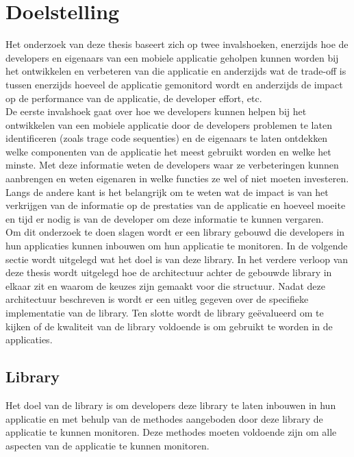 \chapter{Doelstelling}
Het onderzoek van deze thesis baseert zich op twee invalshoeken, enerzijds hoe de developers en eigenaars van een mobiele applicatie geholpen kunnen worden bij het ontwikkelen en verbeteren van die applicatie en anderzijds wat de trade-off is tussen enerzijds hoeveel de applicatie gemonitord wordt en anderzijds de impact op de performance van de applicatie, de developer effort, etc. \\

De eerste invalshoek gaat over hoe we developers kunnen helpen bij het ontwikkelen van een mobiele applicatie door de developers problemen te laten identificeren (zoals trage code sequenties) en de eigenaars te laten ontdekken welke componenten van de applicatie het meest gebruikt worden en welke het minste. Met deze informatie weten de developers waar ze verbeteringen kunnen aanbrengen en weten eigenaren in welke functies ze wel of niet moeten investeren. Langs de andere kant is het belangrijk om te weten wat de impact is van het verkrijgen van de informatie op de prestaties van de applicatie en hoeveel moeite en tijd er nodig is van de developer om deze informatie te kunnen vergaren.\\


Om dit onderzoek te doen slagen wordt er een library gebouwd die developers in hun applicaties kunnen inbouwen om hun applicatie te monitoren. In de volgende sectie wordt uitgelegd wat het doel is van deze library. In het verdere verloop van deze thesis wordt uitgelegd hoe de architectuur achter de gebouwde library in elkaar zit en waarom de keuzes zijn gemaakt voor die structuur. Nadat deze architectuur beschreven is wordt er een uitleg gegeven over de specifieke implementatie van de library. Ten slotte wordt de library ge\"evalueerd om te kijken of de kwaliteit van de library voldoende is om gebruikt te worden in de applicaties. 

\section{Library}
Het doel van de library is om developers deze library te laten inbouwen in hun applicatie en met behulp van de methodes aangeboden door deze library de applicatie te kunnen monitoren. Deze methodes moeten voldoende zijn om alle aspecten van de applicatie te kunnen monitoren. \\

